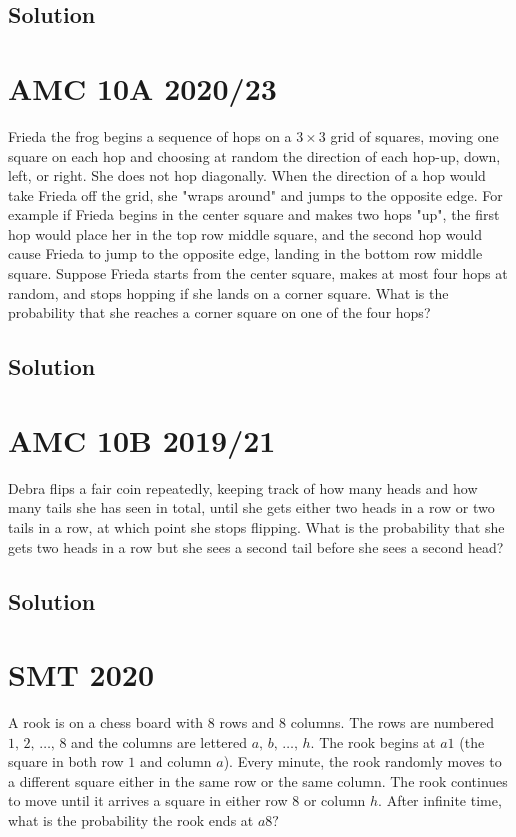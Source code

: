 \documentclass[blue,onecol]{shooting}
\begin{document}
\subsection{Solution}

\section{AMC 10A 2020/23}

Frieda the frog begins a sequence of hops on a $3 \times 3$ grid of squares, moving one square on each hop and choosing at random the direction of each hop-up, down, left, or right. She does not hop diagonally. When the direction of a hop would take Frieda off the grid, she "wraps around" and jumps to the opposite edge. For example if Frieda begins in the center square and makes two hops "up", the first hop would place her in the top row middle square, and the second hop would cause Frieda to jump to the opposite edge, landing in the bottom row middle square. Suppose Frieda starts from the center square, makes at most four hops at random, and stops hopping if she lands on a corner square. What is the probability that she reaches a corner square on one of the four hops?

\subsection{Solution}

\section{AMC 10B 2019/21} Debra flips a fair coin repeatedly, keeping track of how many heads and how many tails she has seen in total, until she gets either two heads in a row or two tails in a row, at which point she stops flipping. What is the probability that she gets two heads in a row but she sees a second tail before she sees a second head?
\subsection{Solution}




\section{SMT 2020} A rook is on a chess board with $8$ rows and $8$ columns. The rows are numbered $1,\, 2,\, \ldots,\, 8$ and the columns are lettered $a,\, b,\, \ldots,\, h.$ The rook begins at $a1$ (the square in both row $1$ and column $a$). Every minute, the rook randomly moves to a different square either in the same row or the same column. The rook continues to move until it arrives a square in either row $8$ or column $h.$ After infinite time, what is the probability the rook ends at $a8?$
\end{document}
